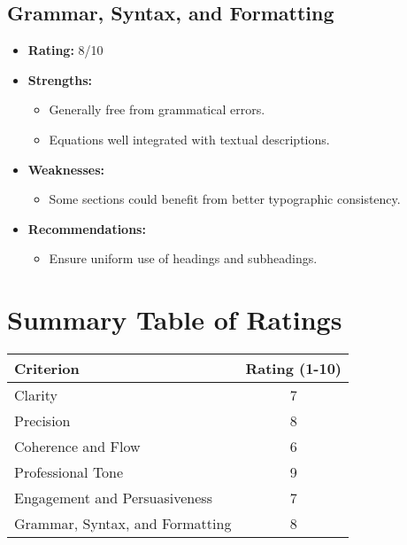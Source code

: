 \documentclass{article}
\begin{document}
\subsection{Grammar, Syntax, and Formatting}
\begin{itemize}
    \item \textbf{Rating:} 8/10
    \item \textbf{Strengths:}
        \begin{itemize}
            \item Generally free from grammatical errors.
            \item Equations well integrated with textual descriptions.
        \end{itemize}
    \item \textbf{Weaknesses:}
        \begin{itemize}
            \item Some sections could benefit from better typographic consistency.
        \end{itemize}
    \item \textbf{Recommendations:}
        \begin{itemize}
            \item Ensure uniform use of headings and subheadings.
        \end{itemize}
\end{itemize}

\section{Summary Table of Ratings}

\begin{center}
\begin{tabular}{|l|c|}
\hline
\textbf{Criterion} & \textbf{Rating (1-10)} \\
\hline
Clarity & 7 \\
Precision & 8 \\
Coherence and Flow & 6 \\
Professional Tone & 9 \\
Engagement and Persuasiveness & 7 \\
Grammar, Syntax, and Formatting & 8 \\
\hline
\end{tabular}
\end{center}
\end{document}
